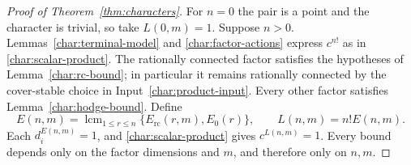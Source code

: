 \begin{proof}[Proof of Theorem~\ref{thm:characters}]
For $n=0$ the pair is a point and the character is trivial, so take
$L(0,m)=1$.  Suppose $n>0$.  Lemmas~\ref{char:terminal-model} and
\ref{char:factor-actions} express $c^{n!}$ as in
\eqref{char:scalar-product}.  The rationally connected factor
satisfies the hypotheses of Lemma~\ref{char:rc-bound}; in particular
it remains rationally connected by the cover-stable choice in
Input~\ref{char:product-input}.  Every other factor satisfies
Lemma~\ref{char:hodge-bound}.  Define
\[
 E(n,m)=\operatorname{lcm}_{1\leq r\leq n}
          \{E_{\mathrm{rc}}(r,m),E_0(r)\},
 \qquad L(n,m)=n!E(n,m).
\]
Each $d_i^{E(n,m)}=1$, and \eqref{char:scalar-product} gives
$c^{L(n,m)}=1$.  Every bound depends only on the factor dimensions
and $m$, and therefore only on $n,m$.
\end{proof}
